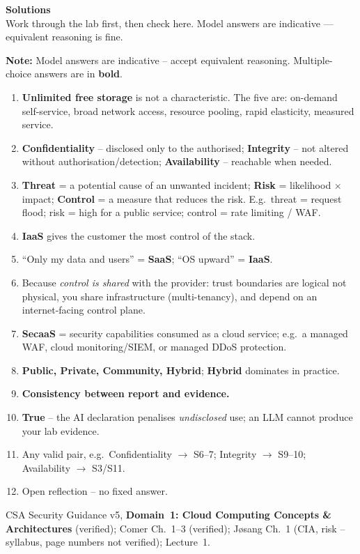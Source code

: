 \documentclass[11pt]{article}
\begin{document}
\signoff

\clearpage
\solheader
{\LARGE\bfseries\color{kred} Solutions}\\[2pt]
{\small Work through the lab first, then check here. Model answers are indicative — equivalent reasoning is fine.}\par\vspace{8pt}
\noindent\textbf{Note:} Model answers are indicative -- accept equivalent reasoning. Multiple-choice
answers are in \textbf{bold}.

\begin{enumerate}
\item \textbf{Unlimited free storage} is not a characteristic. The five are: on-demand self-service,
      broad network access, resource pooling, rapid elasticity, measured service.
\item \textbf{Confidentiality} -- disclosed only to the authorised; \textbf{Integrity} -- not altered
      without authorisation/detection; \textbf{Availability} -- reachable when needed.
\item \textbf{Threat} = a potential cause of an unwanted incident; \textbf{Risk} = likelihood
      $\times$ impact; \textbf{Control} = a measure that reduces the risk. E.g.\ threat = request
      flood; risk = high for a public service; control = rate limiting / WAF.
\item \textbf{IaaS} gives the customer the most control of the stack.
\item ``Only my data and users'' = \textbf{SaaS}; ``OS upward'' = \textbf{IaaS}.
\item Because \emph{control is shared} with the provider: trust boundaries are logical not physical,
      you share infrastructure (multi-tenancy), and depend on an internet-facing control plane.
\item \textbf{SecaaS} = security capabilities consumed as a cloud service; e.g.\ a managed WAF, cloud
      monitoring/SIEM, or managed DDoS protection.
\item \textbf{Public, Private, Community, Hybrid}; \textbf{Hybrid} dominates in practice.
\item \textbf{Consistency between report and evidence.}
\item \textbf{True} -- the AI declaration penalises \emph{undisclosed} use; an LLM cannot produce your
      lab evidence.
\item Any valid pair, e.g.\ Confidentiality $\rightarrow$ S6--7; Integrity $\rightarrow$ S9--10;
      Availability $\rightarrow$ S3/S11.
\item Open reflection -- no fixed answer.
\end{enumerate}

CSA Security Guidance v5, \textbf{Domain~1: Cloud Computing Concepts \& Architectures} (verified);
Comer Ch.~1--3 (verified); J\o sang Ch.~1 (CIA, risk -- syllabus, page numbers not verified);
Lecture~1.
\end{document}
